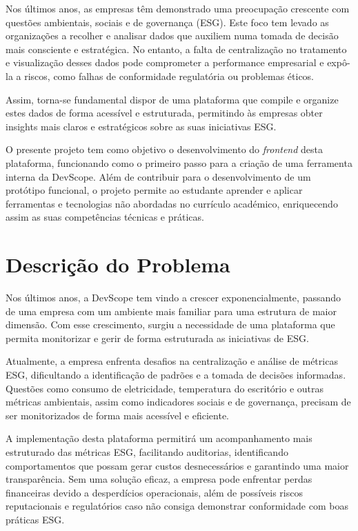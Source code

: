 Nos últimos anos, as empresas têm demonstrado uma preocupação crescente com questões ambientais, sociais e de governança (ESG). Este foco tem levado as organizações a recolher e analisar dados que auxiliem numa tomada de decisão mais consciente e estratégica. No entanto, a falta de centralização no tratamento e visualização desses dados pode comprometer a performance empresarial e expô-la a riscos, como falhas de conformidade regulatória ou problemas éticos.

Assim, torna-se fundamental dispor de uma plataforma que compile e organize estes dados de forma acessível e estruturada, permitindo às empresas obter insights mais claros e estratégicos sobre as suas iniciativas ESG.

O presente projeto tem como objetivo o desenvolvimento do \textit{frontend} desta plataforma, funcionando como o primeiro passo para a criação de uma ferramenta interna da DevScope. Além de contribuir para o desenvolvimento de um protótipo funcional, o projeto permite ao estudante aprender e aplicar ferramentas e tecnologias não abordadas no currículo académico, enriquecendo assim as suas competências técnicas e práticas.


\section{Descrição do Problema}

Nos últimos anos, a DevScope tem vindo a crescer exponencialmente, passando de uma empresa com um ambiente mais familiar para uma estrutura de maior dimensão. Com esse crescimento, surgiu a necessidade de uma plataforma que permita monitorizar e gerir de forma estruturada as iniciativas de \gls{ESG}.

Atualmente, a empresa enfrenta desafios na centralização e análise de métricas ESG, dificultando a identificação de padrões e a tomada de decisões informadas. Questões como consumo de eletricidade, temperatura do escritório e outras métricas ambientais, assim como indicadores sociais e de governança, precisam de ser monitorizados de forma mais acessível e eficiente.

A implementação desta plataforma permitirá um acompanhamento mais estruturado das métricas ESG, facilitando auditorias, identificando comportamentos que possam gerar custos desnecessários e garantindo uma maior transparência. Sem uma solução eficaz, a empresa pode enfrentar perdas financeiras devido a desperdícios operacionais, além de possíveis riscos reputacionais e regulatórios caso não consiga demonstrar conformidade com boas práticas ESG.

